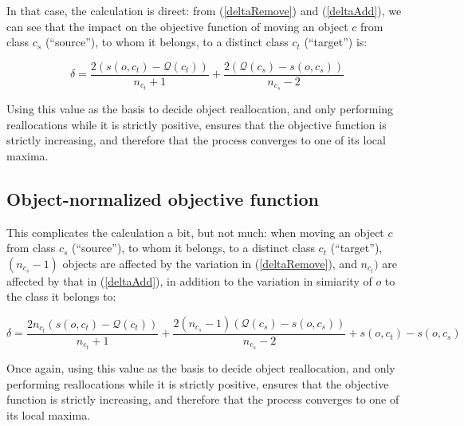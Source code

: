 \documentclass[a4paper,twoside]{article}
\begin{document}
In that case, the calculation is direct: from (\ref{deltaRemove}) and
(\ref{deltaAdd}), we can see that the impact on the objective function
of moving an object $c$ from class $c_s$ (``source''), to whom it
belongs, to a distinct class $c_t$ (``target'') is:

\begin{equation}
  \delta = \frac{2\left(s\left(o, c_t\right)-\mathcal{Q}(c_t)\right)}{n_{c_t}+1} + \frac{2\left( \mathcal{Q}(c_s) - s\left(o, c_s\right)\right)}{n_{c_s}-2}
\end{equation}

Using this value as the basis to decide object reallocation, and only
performing reallocations while it is strictly positive, ensures that
the objective function is strictly increasing, and therefore that the
process converges to one of its local maxima.

\subsection{Object-normalized objective function}

This complicates the calculation a bit, but not much: when moving an
object $c$ from class $c_s$ (``source''), to whom it belongs, to a
distinct class $c_t$ (``target''), $(n_{c_s}-1)$ objects are affected
by the variation in (\ref{deltaRemove}), and $n_{c_t})$ are affected
by that in (\ref{deltaAdd}), in addition to the variation in simiarity
of $o$ to the class it belongs to:

\begin{equation}
  \delta = \frac{2n_{c_t}\left(s\left(o, c_t\right)-\mathcal{Q}(c_t)\right)}{n_{c_t}+1} + \frac{2(n_{c_s}-1)\left( \mathcal{Q}(c_s) - s\left(o, c_s\right)\right)}{n_{c_s}-2} + s(o,c_t) - s(o,c_s)
\end{equation}

Once again, using this value as the basis to decide object
reallocation, and only performing reallocations while it is strictly
positive, ensures that the objective function is strictly increasing,
and therefore that the process converges to one of its local maxima.
\end{document}
